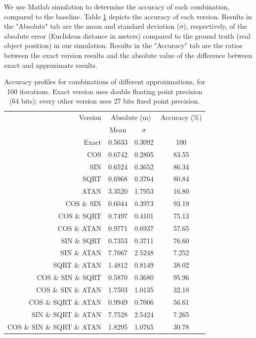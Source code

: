 \par We use Matlab simulation to determine the accuracy of each combination, compared to the baseline. Table \ref{table:acc_profiles} depicts the accuracy of each version. Results in the "Absolute" tab are the mean and standard deviation ($\sigma$), respectively, of the absolute error (Euclidean distance in meters) compared to the ground truth (real object position) in our simulation. Results in the "Accuracy" tab are the ratios between the exact version results and the absolute value of the difference between exact and approximate results.
    


\begin{table}[h]
\begin{tabular}{r c c c}
\toprule
Version & \multicolumn{2}{c}{Absolute (m)} & Accuracy (\%)\\
 & Mean & $\sigma$ & \\
\hline
Exact	& 0.5633 & 0.3092 & 100\\
\hline
COS & 						0.6742	& 0.2805	& 83.55 \\
SIN & 						0.6524	& 0.3652	& 86.34 \\
SQRT & 						0.6968	& 0.3764	& 80.84 \\
ATAN & 						3.3520	& 1.7953	& 16.80 \\
COS \& SIN & 				0.6044	& 0.3973	& 93.19 \\
COS \& SQRT& 				0.7497	& 0.4101	& 75.13 \\
COS \& ATAN & 				0.9771	& 0.6937	& 57.65 \\
SIN \& SQRT & 				0.7353	& 0.3711	& 76.60 \\
SIN \& ATAN & 				7.7667	& 2.5248	& 7.252 \\
SQRT \& ATAN & 				1.4812	& 0.8149	& 38.02 \\
COS \& SIN \& SQRT & 		0.5870	& 0.3680	& 95.96 \\
COS \& SIN \& ATAN& 		1.7503	& 1.0135	& 32.18 \\
COS \& SQRT \& ATAN& 		0.9949	& 0.7006	& 56.61 \\
SIN \& SQRT \& ATAN  & 		7.7528	& 2.5424	& 7.265 \\
COS \& SIN \& SQRT \& ATAN &1.8295 	& 1.0765	& 30.78 \\
\hline
\end{tabular}
\caption{Accuracy profiles for combinations of different approximations, for 100 iterations. Exact version uses double floating point precision (64 bits); every other version uses 27 bits fixed point precision.}
\label{table:acc_profiles}
\end{table}

